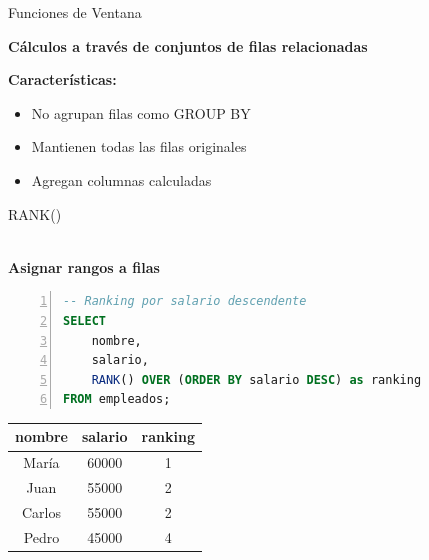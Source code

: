 \documentclass{beamer}
\begin{document}
\begin{frame}{Funciones de Ventana}
    \begin{center}
        \textbf{Cálculos a través de conjuntos de filas relacionadas}
    \end{center}
    
    \vspace{0.3cm}
    
    \textbf{Características:}
    \begin{itemize}
        \item No agrupan filas como GROUP BY
        \item Mantienen todas las filas originales
        \item Agregan columnas calculadas
    \end{itemize}
\end{frame}

\begin{frame}[fragile]{RANK()}
    \begin{center}
        {\Large \faTrophy}\\[0.2cm]
        \textbf{Asignar rangos a filas}
    \end{center}
    
    \vspace{0.3cm}
    
    \begin{lstlisting}[language=SQL, numbers=left, numbersep=5pt]
-- Ranking por salario descendente
SELECT 
    nombre,
    salario,
    RANK() OVER (ORDER BY salario DESC) as ranking
FROM empleados;
    \end{lstlisting}
    
    \vspace{0.3cm}
    
    \begin{center}
        \begin{tabular}{ccc}
            \toprule
            nombre & salario & ranking \\
            \midrule
            María & 60000 & 1 \\
            Juan & 55000 & 2 \\
            Carlos & 55000 & 2 \\
            Pedro & 45000 & 4 \\
            \bottomrule
        \end{tabular}
    \end{center}
\end{frame}
\end{document}
